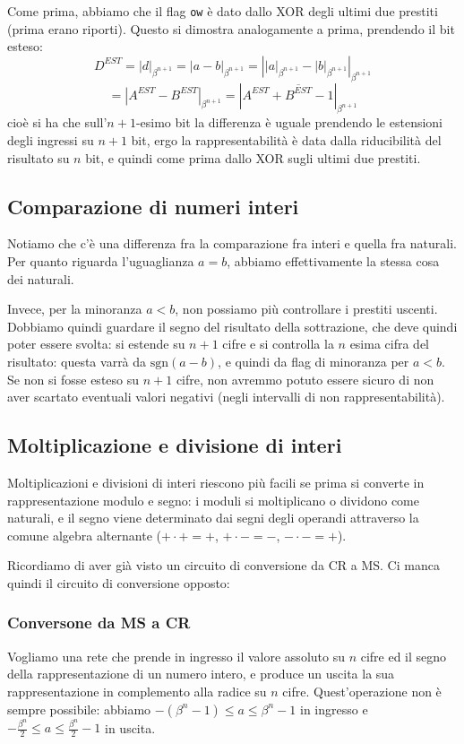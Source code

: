 \documentclass[a4paper,11pt]{article}
\begin{document}
Come prima, abbiamo che il flag \lstinline|ow| è dato dallo XOR degli ultimi due prestiti (prima erano riporti).
Questo si dimostra analogamente a prima, prendendo il bit esteso:
$$
D^{EST} = |d|_{\beta^{n+1}} = |a-b|_{\beta^{n+1}} = \left| |a|_{\beta^{n+1}} - |b|_{\beta^{n+1}} \right|_{\beta^{n+1}} 
$$
$$
= |A^{EST} - B^{EST}|_{\beta^{n+1}} = |A^{EST} + \overline{B^{EST}} -1|_{\beta^{n+1}}
$$
cioè si ha che sull'$n+1$-esimo bit la differenza è uguale prendendo le estensioni degli ingressi su $n+1$ bit, ergo la rappresentabilità è data dalla riducibilità del risultato su $n$ bit, e quindi come prima dallo XOR sugli ultimi due prestiti.

\subsection{Comparazione di numeri interi}
Notiamo che c'è una differenza fra la comparazione fra interi e quella fra naturali.
Per quanto riguarda l'uguaglianza $a = b$, abbiamo effettivamente la stessa cosa dei naturali.

Invece, per la minoranza $a < b$, non possiamo più controllare i prestiti uscenti.
Dobbiamo quindi guardare il segno del risultato della sottrazione, che deve quindi poter essere svolta: si estende su $n+1$ cifre e si controlla la $n$ esima cifra del risultato: questa varrà da $\mathrm{sgn}(a-b)$, e quindi da flag di minoranza per $a < b$.
Se non si fosse esteso su $n+1$ cifre, non avremmo potuto essere sicuro di non aver scartato eventuali valori negativi (negli intervalli di non rappresentabilità).

\subsection{Moltiplicazione e divisione di interi}
Moltiplicazioni e divisioni di interi riescono più facili se prima si converte in rappresentazione modulo e segno: i moduli si moltiplicano o dividono come naturali, e il segno viene determinato dai segni degli operandi attraverso la comune algebra alternante ($+ \cdot + = +$, $+ \cdot - = -$, $- \cdot - = +$).

Ricordiamo di aver già visto un circuito di conversione da CR a MS.
Ci manca quindi il circuito di conversione opposto:

\subsubsection{Conversone da MS a CR}
Vogliamo una rete che prende in ingresso il valore assoluto su $n$ cifre ed il segno della rappresentazione di un numero intero, e produce un uscita la sua rappresentazione in complemento alla radice su $n$ cifre.
Quest'operazione non è sempre possibile: abbiamo $-(\beta^n - 1) \leq a \leq \beta^n - 1$ in ingresso e $-\frac{\beta^n}{2} \leq a \leq \frac{\beta^n}{2} - 1$ in uscita.
\end{document}
